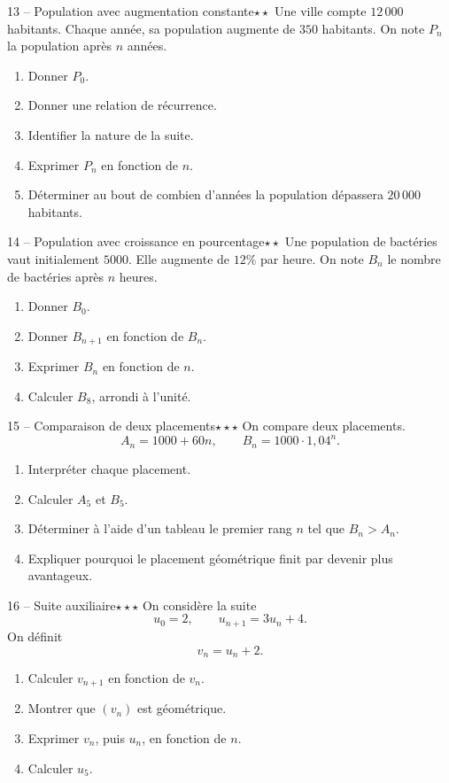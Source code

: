 \documentclass[11pt,a4paper]{article}
\newcommand{\deuxetoiles}{\(\star\star\)}
\newcommand{\troisetoiles}{\(\star\star\star\)}
\begin{document}
\begin{exobox}{13 -- Population avec augmentation constante}{\deuxetoiles}
Une ville compte \(12\,000\) habitants. Chaque année, sa population augmente de \(350\) habitants. On note \(P_n\) la population après \(n\) années.
\begin{enumerate}[label=\alph*)]
  \item Donner \(P_0\).
  \item Donner une relation de récurrence.
  \item Identifier la nature de la suite.
  \item Exprimer \(P_n\) en fonction de \(n\).
  \item Déterminer au bout de combien d'années la population dépassera \(20\,000\) habitants.
\end{enumerate}
\end{exobox}

\begin{exobox}{14 -- Population avec croissance en pourcentage}{\deuxetoiles}
Une population de bactéries vaut initialement \(5000\). Elle augmente de \(12\%\) par heure. On note \(B_n\) le nombre de bactéries après \(n\) heures.
\begin{enumerate}[label=\alph*)]
  \item Donner \(B_0\).
  \item Donner \(B_{n+1}\) en fonction de \(B_n\).
  \item Exprimer \(B_n\) en fonction de \(n\).
  \item Calculer \(B_8\), arrondi à l'unité.
\end{enumerate}
\end{exobox}

\begin{exobox}{15 -- Comparaison de deux placements}{\troisetoiles}
On compare deux placements.
\[
A_n=1000+60n,\qquad B_n=1000\cdot 1{,}04^n.
\]
\begin{enumerate}[label=\alph*)]
  \item Interpréter chaque placement.
  \item Calculer \(A_5\) et \(B_5\).
  \item Déterminer à l'aide d'un tableau le premier rang \(n\) tel que \(B_n>A_n\).
  \item Expliquer pourquoi le placement géométrique finit par devenir plus avantageux.
\end{enumerate}
\end{exobox}

\begin{exobox}{16 -- Suite auxiliaire}{\troisetoiles}
On considère la suite
\[
u_0=2,\qquad u_{n+1}=3u_n+4.
\]
On définit
\[
v_n=u_n+2.
\]
\begin{enumerate}[label=\alph*)]
  \item Calculer \(v_{n+1}\) en fonction de \(v_n\).
  \item Montrer que \((v_n)\) est géométrique.
  \item Exprimer \(v_n\), puis \(u_n\), en fonction de \(n\).
  \item Calculer \(u_5\).
\end{enumerate}
\end{exobox}
\end{document}
